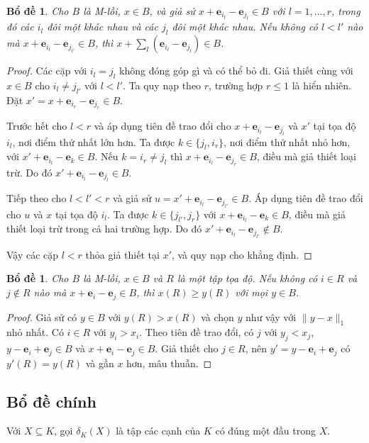 \documentclass[pdflatex,sn-mathphys-num]{sn-jnl}
\theoremstyle{thmstyleone}%
\newtheorem{lemma}[theorem]{Bổ đề}%
\theoremstyle{thmstyletwo}%
\theoremstyle{thmstylethree}%
\newcommand{\e}{\mathbf{e}}
\begin{document}
\begin{lemma}\label{lem:exchange}
Cho $B$ là M-lồi, $x\in B$, và giả sử $x+\e_{i_l}-\e_{j_l}\in B$ với $l=1,\dots,r$, trong đó các $i_l$ đôi một khác nhau và các $j_l$ đôi một khác nhau. Nếu không có $l<l'$ nào mà $x+\e_{i_l}-\e_{j_{l'}}\in B$, thì $x+\sum_l(\e_{i_l}-\e_{j_l})\in B$.
\end{lemma}

\begin{proof}
Các cặp với $i_l=j_l$ không đóng góp gì và có thể bỏ đi. Giả thiết cùng với $x\in B$ cho $i_l\ne j_{l'}$ với $l<l'$. Ta quy nạp theo $r$, trường hợp $r\le1$ là hiển nhiên. Đặt $x'=x+\e_{i_r}-\e_{j_r}\in B$.

Trước hết cho $l<r$ và áp dụng tiên đề trao đổi cho $x+\e_{i_l}-\e_{j_l}$ và $x'$ tại tọa độ $i_l$, nơi điểm thứ nhất lớn hơn. Ta được $k\in\{j_l,i_r\}$, nơi điểm thứ nhất nhỏ hơn, với $x'+\e_{i_l}-\e_k\in B$. Nếu $k=i_r\ne j_l$ thì $x+\e_{i_l}-\e_{j_r}\in B$, điều mà giả thiết loại trừ. Do đó $x'+\e_{i_l}-\e_{j_l}\in B$.

Tiếp theo cho $l<l'<r$ và giả sử $u=x'+\e_{i_l}-\e_{j_{l'}}\in B$. Áp dụng tiên đề trao đổi cho $u$ và $x$ tại tọa độ $i_l$. Ta được $k\in\{j_{l'},j_r\}$ với $x+\e_{i_l}-\e_k\in B$, điều mà giả thiết loại trừ trong cả hai trường hợp. Do đó $x'+\e_{i_l}-\e_{j_{l'}}\notin B$.

Vậy các cặp $l<r$ thỏa giả thiết tại $x'$, và quy nạp cho khẳng định.
\end{proof}

\begin{lemma}\label{lem:localmax}
Cho $B$ là M-lồi, $x\in B$ và $R$ là một tập tọa độ. Nếu không có $i\in R$ và $j\notin R$ nào mà $x+\e_i-\e_j\in B$, thì $x(R)\ge y(R)$ với mọi $y\in B$.
\end{lemma}

\begin{proof}
Giả sử có $y\in B$ với $y(R)>x(R)$ và chọn $y$ như vậy với $\lVert y-x\rVert_1$ nhỏ nhất. Có $i\in R$ với $y_i>x_i$. Theo tiên đề trao đổi, có $j$ với $y_j<x_j$, $y-\e_i+\e_j\in B$ và $x+\e_i-\e_j\in B$. Giả thiết cho $j\in R$, nên $y'=y-\e_i+\e_j$ có $y'(R)=y(R)$ và gần $x$ hơn, mâu thuẫn.
\end{proof}

\subsection{Bổ đề chính}

Với $X\subseteq K$, gọi $\delta_K(X)$ là tập các cạnh của $K$ có đúng một đầu trong $X$.
\end{document}
